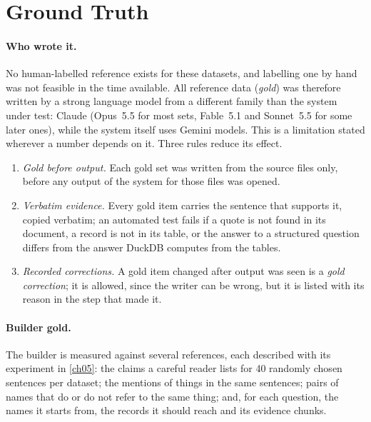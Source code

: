 \section{Ground Truth}\label{sec:ch03-ground-truth}

\paragraph{Who wrote it.} No human-labelled reference exists for these datasets, and labelling one by hand
was not feasible in the time available. All reference data (\emph{gold}) was therefore written by a strong
language model from a different family than the system under test: Claude (Opus~5.5 for most sets, Fable~5.1
and Sonnet~5.5 for some later ones), while the system itself uses Gemini models. This is a limitation stated
wherever a number depends on it. Three rules reduce its effect.

\begin{enumerate}[nosep]
\item \emph{Gold before output.} Each gold set was written from the source files only, before any output of
the system for those files was opened.
\item \emph{Verbatim evidence.} Every gold item carries the sentence that supports it, copied verbatim; an
automated test fails if a quote is not found in its document, a record is not in its table, or the answer to
a structured question differs from the answer DuckDB computes from the tables.
\item \emph{Recorded corrections.} A gold item changed after output was seen is a \emph{gold correction}; it
is allowed, since the writer can be wrong, but it is listed with its reason in the step that made it.
\end{enumerate}

\paragraph{Builder gold.} The builder is measured against several references, each described with its
experiment in \cref{ch05}: the claims a careful reader lists for 40 randomly chosen sentences per dataset; the
mentions of things in the same sentences; pairs of names that do or do not refer to the same thing; and, for
each question, the names it starts from, the records it should reach and its evidence chunks.

